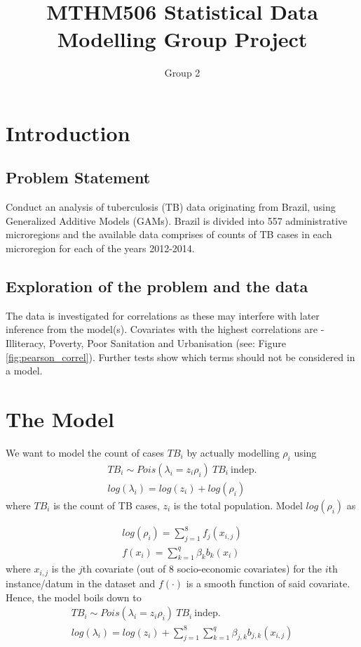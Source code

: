 \documentclass{article}
\title{MTHM506 Statistical Data Modelling Group Project}
\author{Group 2}
\begin{document}
\maketitle

\section{Introduction}

\subsection{Problem Statement}

Conduct an analysis of tuberculosis (TB) data originating from Brazil, using Generalized
Additive Models (GAMs). Brazil is divided into 557 administrative microregions and the available data
comprises of counts of TB cases in each microregion for each of the years 2012-2014.
\newline

\subsection{Exploration of the problem and the data}

The data is investigated for correlations as these may interfere with later inference from the model(s). Covariates with the highest correlations are - Illiteracy, Poverty, Poor Sanitation and Urbanisation (see: Figure \ref{fig:pearson_correl}). Further tests show which terms should not be considered in a model.
\newline

\section{The Model}	

We want to model the count of cases $TB_i$ by actually modelling $\rho_i$ using
$$
\begin{aligned}
TB_i \sim Pois(\lambda_i = z_i \rho_i) \ TB_i\  \mathrm{indep.} 
\\
log(\lambda_i) = log(z_i) + log(\rho_i)
\end{aligned}
$$
where $TB_i$ is the count of TB cases, $z_i$ is the total population. Model $log(\rho_i)$ as

$$
\begin{aligned}
log(\rho_i) = \sum_{j=1}^{8}f_{j}(x_{i,j})
\\
f(x_i) = \sum_{k=1}^{q}\beta_{k}b_{k}(x_i)
\end{aligned}
$$
where $x_{i,j}$ is the $j$th covariate (out of 8 socio-economic covariates) for the $i$th instance/datum in the dataset and $f(\cdot)$ is a smooth function of said covariate. Hence, the model boils down to
$$
\begin{aligned}
TB_i \sim Pois(\lambda_i = z_i \rho_i) \ TB_i\  \mathrm{indep.} 
\\
log(\lambda_i) = log(z_i) +  \sum_{j=1}^{8}\sum_{k=1}^{q}\beta_{j,k}b_{j,k}(x_{i,j})
\end{aligned}
$$
\end{document}
